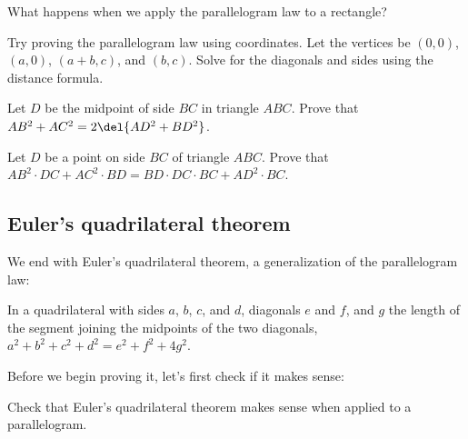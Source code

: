\documentclass[11pt,paper=letter]{scrartcl}
\begin{document}
\begin{mdframed}[style=exmdbox]
  \begin{exercise}
    What happens when we apply the parallelogram law to a rectangle?
  \end{exercise}

  \begin{exercise}
    Try proving the parallelogram law using coordinates. Let the vertices be $(0, 0)$, $(a, 0)$, $(a + b, c)$, and $(b, c)$. Solve for the diagonals and sides using the distance formula.
  \end{exercise}

  \begin{problem}
    Let $D$ be the midpoint of side $BC$ in triangle $ABC$. Prove that $AB^2 + AC^2 = 2\del{AD^2 + BD^2}$. \hint{\ref{h:pl31}}
  \end{problem}

  \begin{problem}
    Let $D$ be a point on side $BC$ of triangle $ABC$. Prove that $AB^2 \cdot DC + AC^2 \cdot BD = BD \cdot DC \cdot BC + AD^2 \cdot BC.$ \hint{\ref{h:pl41}}
  \end{problem}
\end{mdframed}

\subsection{Euler's quadrilateral theorem}

We end with Euler's quadrilateral theorem, a generalization of the parallelogram law:

\begin{thmboxed}
  In a quadrilateral with sides $a$, $b$, $c$, and $d$, diagonals $e$ and $f$, and $g$ the length of the segment joining the midpoints of the two diagonals, $a^2 + b^2 + c^2 + d^2 = e^2 + f^2 + 4g^2$.
\end{thmboxed}

\newpage

Before we begin proving it, let's first check if it makes sense:

\begin{exboxed}
  Check that Euler's quadrilateral theorem makes sense when applied to a parallelogram.
\end{exboxed}
\end{document}

